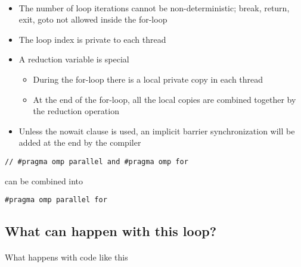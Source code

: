 \paragraph{}
\begin{itemize}
\item The number of loop iterations cannot be non-deterministic; break, return, exit, goto not allowed inside the for-loop

\item The loop index is private to each thread

\item A reduction variable is special
\begin{itemize}

  \item During the for-loop there is a local private copy in each thread

  \item At the end of the for-loop, all the local copies are combined together by the reduction operation

\end{itemize}

\noindent
\item Unless the nowait clause is used, an implicit barrier synchronization will be added at the end by the compiler
\end{itemize}

\noindent


\begin{verbatim}
// #pragma omp parallel and #pragma omp for

\end{verbatim}

can be combined into


\begin{verbatim}
#pragma omp parallel for

\end{verbatim}



\subsection*{What can happen with this loop?}


\paragraph{}
What happens with code like this 



